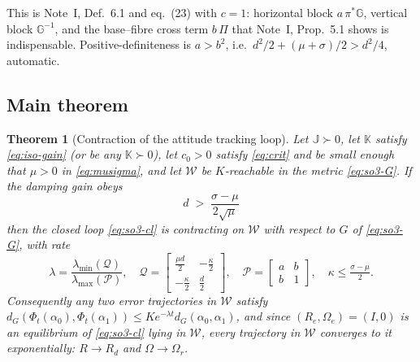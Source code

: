 \documentclass[11pt,a4paper]{article}
\newcommand{\Gm}{\mathbb{G}}
\newcommand{\Jm}{\mathbb{J}}
\newcommand{\Km}{\mathbb{K}}
\newcommand{\Ome}{\Omega_{\!e}}
\newcommand{\Omr}{\Omega_{\!r}}
\theoremstyle{plain}
\newtheorem{theorem}{Theorem}[section]
\theoremstyle{definition}
\theoremstyle{remark}
\begin{document}
This is Note~I, Def.~6.1 and eq.~(23) with $c=1$: horizontal block $a\,\pi^{*}\Gm$,
vertical block $\Gm^{-1}$, and the base--fibre cross term $b\,\Pi$ that Note~I,
Prop.~5.1 shows is indispensable. Positive-definiteness is
$a > b^2$, i.e.\ $d^2/2 + (\mu+\sigma)/2 > d^2/4$, automatic.

\subsection{Main theorem}

\begin{theorem}[Contraction of the attitude tracking loop]
\label{thm:so3}
Let $\Jm\succ0$, let $\Km$ satisfy \eqref{eq:iso-gain} (or be any $\Km\succ0$), let
$c_0>0$ satisfy \eqref{eq:crit} and be small enough that $\mu>0$ in
\eqref{eq:musigma}, and let $\mathcal{W}$ be $K$-reachable in the metric
\eqref{eq:so3-G}. If the damping gain obeys
\begin{equation}
  \boxed{\;\; d \;>\; \frac{\sigma-\mu}{2\sqrt{\mu}} \;\;}
  \label{eq:so3-cond}
\end{equation}
then the closed loop \eqref{eq:so3-cl} is contracting on $\mathcal{W}$ with respect
to $G$ of \eqref{eq:so3-G}, with rate
\begin{equation}
  \lambda = \frac{\lambda_{\min}(\mathcal{Q})}{\lambda_{\max}(\mathcal{P})},
  \quad
  \mathcal{Q} = \begin{bmatrix}\tfrac{\mu d}{2} & -\tfrac{\kappa}{2}\\[2pt]
                               -\tfrac{\kappa}{2} & \tfrac{d}{2}\end{bmatrix},
  \quad
  \mathcal{P} = \begin{bmatrix}a & b\\ b& 1\end{bmatrix},
  \quad
  \kappa \le \tfrac{\sigma-\mu}{2}.
\end{equation}
Consequently any two error trajectories in $\mathcal{W}$ satisfy
$d_G(\Phi_t(\alpha_0),\Phi_t(\alpha_1)) \le Ke^{-\lambda t}d_G(\alpha_0,\alpha_1)$,
and since $(R_e,\Ome)=(I,0)$ is an equilibrium of \eqref{eq:so3-cl} lying in
$\mathcal{W}$, every trajectory in $\mathcal{W}$ converges to it exponentially:
$R\to R_d$ and $\Omega\to\Omr$.
\end{theorem}
\end{document}
